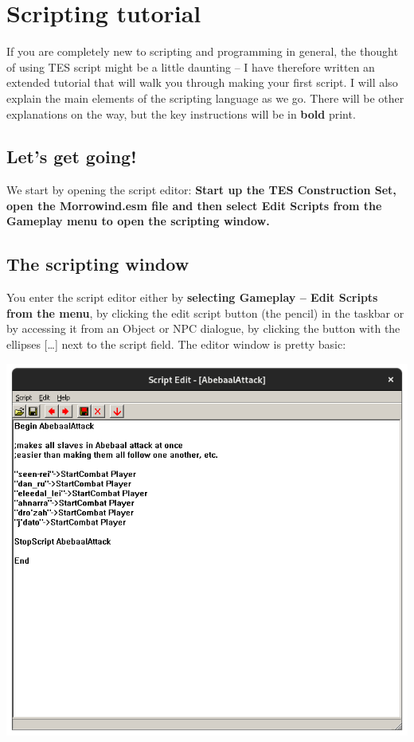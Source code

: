 \section{Scripting tutorial}

If you are completely new to scripting and programming in general, the thought of using TES script might be a little daunting -- I have therefore written an extended tutorial that will walk you through making your first script. I will also explain the main elements of the scripting language as we go. There will be other explanations on the way, but the key instructions will be in \textbf{bold} print.

\hypertarget{lets-get-going}{%
\subsection{Let's get going!}\label{lets-get-going}}

We start by opening the script editor: \textbf{Start up the TES Construction Set, open the Morrowind.esm file and then select Edit Scripts from the Gameplay menu to open the scripting window.}

\hypertarget{the-scripting-window}{%
\subsection{The scripting window}\label{the-scripting-window}}

You enter the script editor either by \textbf{selecting Gameplay -- Edit Scripts from the menu}, by clicking the edit script button (the pencil) in the taskbar or by accessing it from an Object or NPC dialogue, by clicking the button with the ellipses {[}\ldots{]} next to the script field. The editor window is pretty basic:


\includegraphics{media/script-abebaal-attack.png}

